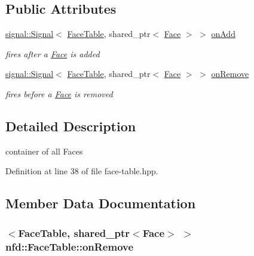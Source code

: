 \subsection*{Public Attributes}
\begin{DoxyCompactItemize}
\item 
\hyperlink{classndn_1_1util_1_1signal_1_1Signal}{signal\+::\+Signal}$<$ \hyperlink{classnfd_1_1FaceTable}{Face\+Table}, shared\+\_\+ptr$<$ \hyperlink{classnfd_1_1Face}{Face} $>$ $>$ \hyperlink{classnfd_1_1FaceTable_ad3b093103b86367194def37a3f97ea92}{on\+Add}\hypertarget{classnfd_1_1FaceTable_ad3b093103b86367194def37a3f97ea92}{}\label{classnfd_1_1FaceTable_ad3b093103b86367194def37a3f97ea92}

\begin{DoxyCompactList}\small\item\em fires after a \hyperlink{classnfd_1_1Face}{Face} is added \end{DoxyCompactList}\item 
\hyperlink{classndn_1_1util_1_1signal_1_1Signal}{signal\+::\+Signal}$<$ \hyperlink{classnfd_1_1FaceTable}{Face\+Table}, shared\+\_\+ptr$<$ \hyperlink{classnfd_1_1Face}{Face} $>$ $>$ \hyperlink{classnfd_1_1FaceTable_adfd530ba7b6df010f7915d7fd182d7f2}{on\+Remove}
\begin{DoxyCompactList}\small\item\em fires before a \hyperlink{classnfd_1_1Face}{Face} is removed \end{DoxyCompactList}\end{DoxyCompactItemize}


\subsection{Detailed Description}
container of all Faces 

Definition at line 38 of file face-\/table.\+hpp.



\subsection{Member Data Documentation}
\subsubsection[{\texorpdfstring{on\+Remove}{onRemove}}]{$<${\bf Face\+Table}, shared\+\_\+ptr$<${\bf Face}$>$ $>$ nfd\+::\+Face\+Table\+::on\+Remove}\hypertarget{classnfd_1_1FaceTable_adfd530ba7b6df010f7915d7fd182d7f2}{}\label{classnfd_1_1FaceTable_adfd530ba7b6df010f7915d7fd182d7f2}


